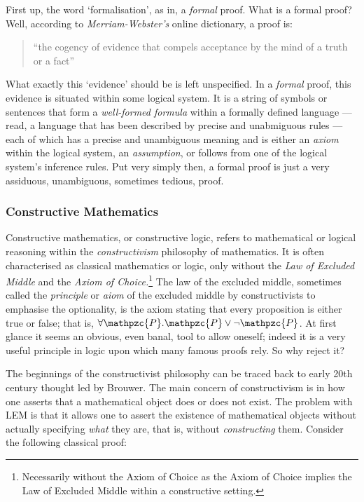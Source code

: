 \documentclass[oneside,12pt]{article}
\newcommand{\textM}[1]{\ensuremath{\mathpzc{#1}}}
\begin{document}
First up, the word `formalisation', as in, a \emph{formal} proof. What is a formal proof? Well, according to \emph{Merriam-Webster's} online dictionary, a proof is:

\begin{quote}
  ``the cogency of evidence that compels acceptance by the mind of a truth or a fact''
\end{quote}


What exactly this `evidence' should be is left unspecified. In a \emph{formal} proof, this evidence is situated within some logical system. It is a string of symbols or sentences that form a \emph{well-formed formula} within a formally defined language --- read, a language that has been described by precise and unabmiguous rules --- each of which has a precise and unambiguous meaning and is either an \emph{axiom} within the logical system, an \emph{assumption}, or follows from one of the logical system's inference rules. Put very simply then, a formal proof is just a very assiduous, unambiguous, sometimes tedious, proof. 


\subsubsection{Constructive Mathematics}


Constructive mathematics, or constructive logic, refers to mathematical or logical reasoning within the \emph{constructivism} philosophy of mathematics. It is often characterised as classical mathematics or logic, only without the \emph{Law of Excluded Middle} and the \emph{Axiom of Choice.}\footnote{Necessarily without the Axiom of Choice as the Axiom of Choice implies the Law of Excluded Middle within a constructive setting.} The law of the excluded middle, sometimes called the \emph{principle} or \emph{aiom} of the excluded middle by constructivists to emphasise the optionality, is the axiom stating that every proposition is either true or false; that is, $\forall \textM{P} . \textM{P} \vee \neg \textM{P}$. At first glance it seems an obvious, even banal, tool to allow oneself; indeed it is a very useful principle in logic upon which many famous proofs rely. So why reject it?

The beginnings of the constructivist philosophy can be traced back to early 20th century thought led by Brouwer. The main concern of constructivism is in how one asserts that a mathematical object does or does not exist. The problem with LEM is that it allows one to assert the existence of mathematical objects without actually specifying \emph{what} they are, that is, without \emph{constructing} them. Consider the following classical proof:
\end{document}
